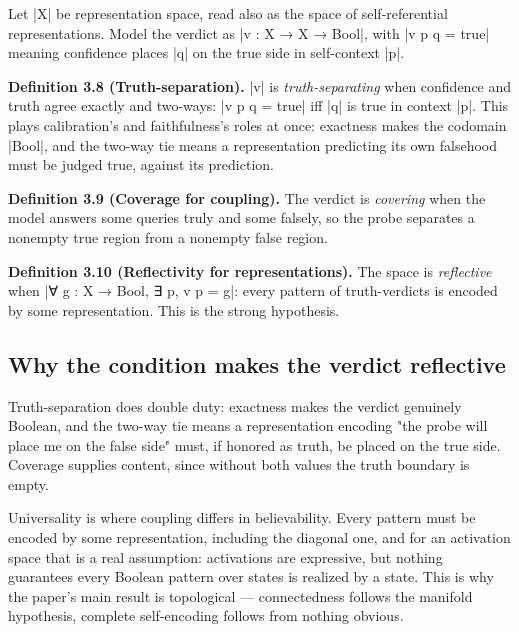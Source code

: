 \documentclass{memoir}
\begin{document}
Let \LeanVerb|X| be representation space, read also as the space of self-referential
representations. Model the verdict as \LeanVerb|v : X → X → Bool|, with \LeanVerb|v p q = true|
meaning confidence places \LeanVerb|q| on the true side in self-context \LeanVerb|p|.

\textbf{Definition 3.8 (Truth-separation).} \LeanVerb|v| is \emph{truth-separating} when confidence and
truth agree exactly and two-ways: \LeanVerb|v p q = true| iff \LeanVerb|q| is true in context \LeanVerb|p|.
This plays calibration's and faithfulness's roles at once: exactness makes the
codomain \LeanVerb|Bool|, and the two-way tie means a representation predicting its own
falsehood must be judged true, against its prediction.

\textbf{Definition 3.9 (Coverage for coupling).} The verdict is \emph{covering} when the model
answers some queries truly and some falsely, so the probe separates a nonempty
true region from a nonempty false region.

\textbf{Definition 3.10 (Reflectivity for representations).} The space is \emph{reflective} when
\LeanVerb|∀ g : X → Bool, ∃ p, v p = g|: every pattern of truth-verdicts is encoded by
some representation. This is the strong hypothesis.



\subsection{Why the condition makes the verdict reflective}\label{Two--Schemas--of--Impossibility-005F-005F-005F--Machine--Checked--Limits--of--Trustworthy--Machine--Learning-005F-005F-005F--and--Why--They--Tighten--with--Capability----Three--Trilemmata-005F-005F-005F--One--Theorem----The--Coupling--Theorem----Why--the--condition--makes--the--verdict--reflective}

Truth-separation does double duty: exactness makes the verdict genuinely
Boolean, and the two-way tie means a representation encoding "the probe will
place me on the false side" must, if honored as truth, be placed on the true
side. Coverage supplies content, since without both values the truth boundary is
empty.

Universality is where coupling differs in believability. Every pattern must be
encoded by some representation, including the diagonal one, and for an
activation space that is a real assumption: activations are expressive, but
nothing guarantees every Boolean pattern over states is realized by a state.
This is why the paper's main result is topological — connectedness follows the
manifold hypothesis, complete self-encoding follows from nothing obvious.
\end{document}
